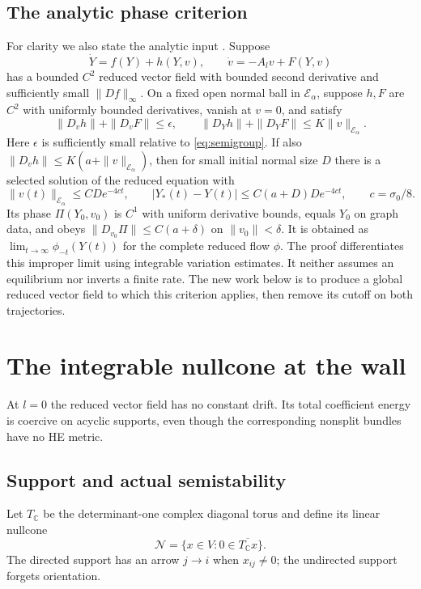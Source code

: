 \documentclass[11pt]{amsart}
\theoremstyle{definition}
\theoremstyle{remark}
\newcommand{\CC}{\mathbb C}
\begin{document}
\subsection{The analytic phase criterion}
For clarity we also state the analytic input
\cite[Proposition 4.1]{WuebbenPhase26}. Suppose
\[
 \dot Y=f(Y)+h(Y,v),\qquad \dot v=-A_lv+F(Y,v)
\]
has a bounded $C^2$ reduced vector field with bounded second derivative
and sufficiently small $\|Df\|_\infty$. On a fixed open normal
ball in $\mathcal E_\alpha$, suppose $h,F$ are $C^2$ with
uniformly bounded derivatives, vanish at $v=0$, and satisfy
\[
 \|D_vh\|+\|D_vF\|\le\epsilon,\qquad
 \|D_Yh\|+\|D_YF\|\le K\|v\|_{\mathcal E_\alpha}.
\]
Here $\epsilon$ is sufficiently small relative to
\eqref{eq:semigroup}. If also
$\|D_vh\|\le K(a+\|v\|_{\mathcal E_\alpha})$, then for small
initial normal size $D$ there is a selected solution of the reduced equation with
\begin{equation}\label{eq:phase-input}
 \|v(t)\|_{\mathcal E_\alpha}\le CD e^{-4ct},\qquad
 |Y_*(t)-Y(t)|\le C(a+D)D e^{-4ct},\qquad c=\sigma_0/8 .
\end{equation}
Its phase $\Pi(Y_0,v_0)$ is $C^1$ with uniform derivative bounds,
equals $Y_0$ on graph data, and obeys
$\|D_{v_0}\Pi\|\le C(a+\delta)$ on $\|v_0\|<\delta$.
It is obtained as $\lim_{t\to\infty}\phi_{-t}(Y(t))$ for
the complete reduced flow $\phi$. The proof differentiates
this improper limit using integrable variation estimates.
It neither assumes an equilibrium nor inverts a finite rate.
The new work below is to produce a global reduced vector field to which
this criterion applies, then remove its cutoff on both trajectories.

\section{The integrable nullcone at the wall}\label{sec:wall}

At $l=0$ the reduced vector field has no constant drift. Its total
coefficient energy is coercive on acyclic supports, even though
the corresponding nonsplit bundles have no HE metric.

\subsection{Support and actual semistability}
Let $T_{\CC}$ be the determinant-one complex diagonal torus and
define its linear nullcone
\[
 \mathcal N=\{x\in V:0\in\overline{T_{\CC}x}\}.
\]
The directed support has an arrow $j\to i$ when $x_{ij}\ne0$;
the undirected support forgets orientation.
\end{document}
